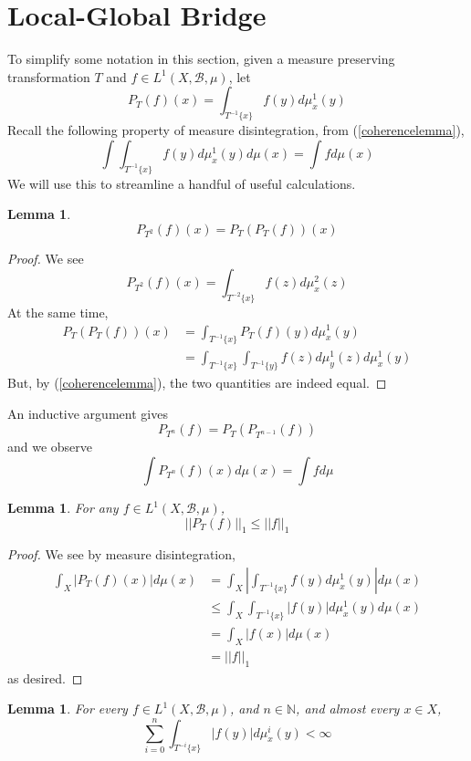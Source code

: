 \documentclass{article}
\newcommand{\N}{\mathbb{N}}
\newcommand{\B}{\mathcal{B}}
\newcommand{\norm}[1]{\left\vert\left\vert#1\right\vert\right\vert}
\newcommand{\abs}[1]{\left\vert#1\right\vert}
\let\oldref\ref
\renewcommand{\ref}[1]{(\oldref{#1})}
\newtheorem{lemma}[theorem]{Lemma}
\theoremstyle{definition}
\begin{document}
\section{Local-Global Bridge}
To simplify some notation in this section, given a measure preserving transformation $ T $ and $ f\in L^1(X,\mathcal{B},\mu) $, let 
\[
P_T(f)(x) = \int_{T^{-1}\{x\}} f(y)d\mu^1_x(y) 
\] 
Recall the following property of measure disintegration, from \ref{coherencelemma},
\[
\int \int_{T^{-1}\{x\}}f(y)d\mu^1_x(y)d\mu(x) = \int f d\mu(x)
\]
We will use this to streamline a handful of useful calculations.
\begin{lemma}
    \[
    P_{T^2}(f)(x) = P_T(P_T(f))(x) 
    \]
\end{lemma}
\begin{proof}
    We see
    \[
    P_{T^2}(f)(x) = \int_{T^{-2}\{x\}} f(z)d\mu^2_x(z)
    \]
    At the same time,
    \begin{align*}
        P_T(P_T(f))(x) &= \int_{T^{-1}\{x\}} P_T(f)(y)d\mu^1_x(y)\\
        &= \int_{T^{-1}\{x\}}\int_{T^{-1}\{y\}} f(z)d\mu^1_y(z)d\mu^1_x(y)
    \end{align*}
    But, by \ref{coherencelemma}, the two quantities are indeed equal.
\end{proof}
\noindent An inductive argument gives 
\begin{equation}
    P_{T^n}(f) = P_T(P_{T^{n-1}}(f))
\end{equation}
and we observe
\begin{equation} 
    \int P_{T^n}(f)(x)d\mu(x) = \int fd\mu
\end{equation}
\begin{lemma}
    For any $ f\in L^1(X,\B,\mu) $,
    \[
    \norm{P_T(f)}_1 \leq \norm{f}_1
    \]
\end{lemma}
\begin{proof}
    We see by measure disintegration,
    \begin{align*}
        \int_X \abs{P_T(f)(x)}d\mu(x) &= \int_X \abs{\int_{T^{-1}\{x\}} f(y)d\mu^1_x(y)}d\mu(x)\\
        &\leq \int_X \int_{T^{-1}\{x\}} \abs{f(y)}d\mu_x^1(y) d\mu(x)\\
        & = \int_X |f(x)|d\mu(x)\\
        &= \norm{f}_1
    \end{align*}
    as desired.
\end{proof}
\begin{lemma}
    For every $ f\in L^1(X,\B,\mu) $, and $ n\in \N $, and almost every $ x\in X $,
    \[
    \sum_{i=0}^n \int_{T^{-i}\{x\}}\abs{f(y)}d\mu^i_x(y) <\infty
    \]
\end{lemma}
\end{document}
